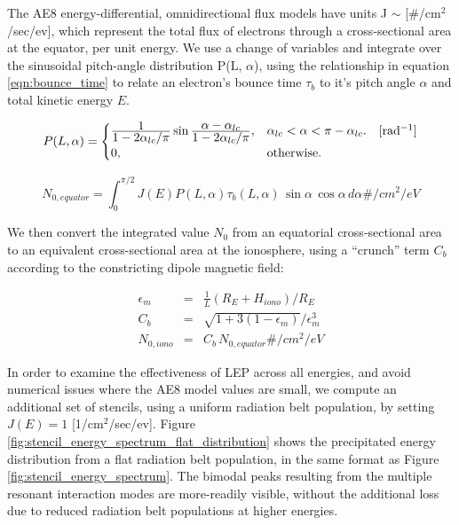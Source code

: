 The AE8 energy-differential, omnidirectional flux models have units J $\sim$ [$\#$/cm$^2$/sec/ev], which represent the total flux of electrons through a cross-sectional area at the equator, per unit energy. We use a change of variables and integrate over the sinusoidal pitch-angle distribution P(L, $\alpha$), using the relationship in equation \eqref{eqn:bounce_time} to relate an electron's bounce time $\tau_b$ to it's pitch angle $\alpha$ and total kinetic energy $E$.

\begin{equation}
  P(L,\alpha)=\begin{cases}
    \frac{\displaystyle 1}{\displaystyle 1 - 2\alpha_{lc}/\pi}\sin{\ensuremath{\frac{\displaystyle \alpha - \alpha_{lc}}{\displaystyle 1 - 2\alpha_{lc}/\pi}}}, & \text{$\alpha_{lc} < \alpha < \pi - \alpha_{lc}$}. \quad[\mathrm{rad^{-1}}]\\
    0, & \text{otherwise}.
  \end{cases}
\end{equation}


\begin{equation}
N_{0,equator} = \int_0^{\pi/2} J(E)P(L,\alpha) \tau_b(L, \alpha)\,\sin{\alpha}\,\cos{\alpha}\,d\alpha \unit{\#/cm^2/eV}
\end{equation}

We then convert the integrated value $N_0$ from an equatorial cross-sectional area to an equivalent cross-sectional area at the ionosphere, using a ``crunch'' term $C_b$ according to the constricting dipole magnetic field:

\begin{eqnarray}
\epsilon_m &= & \frac{1}{L}(R_E + H_{iono})/R_E \\
C_b & = & \sqrt{1 + 3(1 - \epsilon_m)} / \epsilon_m^3 \\ 
N_{0, iono} &=& C_b\,N_{0, equator} \unit{\#/cm^2/eV}
\label{eqn:fieldline_density}
\end{eqnarray}

In order to examine the effectiveness of LEP across all energies, and avoid numerical issues where the AE8 model values are small, we compute an additional set of stencils, using a uniform radiation belt population, by setting $J(E) = 1$ [1/cm$^2$/sec/ev].  Figure \ref{fig:stencil_energy_spectrum_flat_distribution} shows the precipitated energy distribution from a flat radiation belt population, in the same format as Figure \ref{fig:stencil_energy_spectrum}. The bimodal peaks resulting from the multiple resonant interaction modes are more-readily visible, without the additional loss due to reduced radiation belt populations at higher energies.

